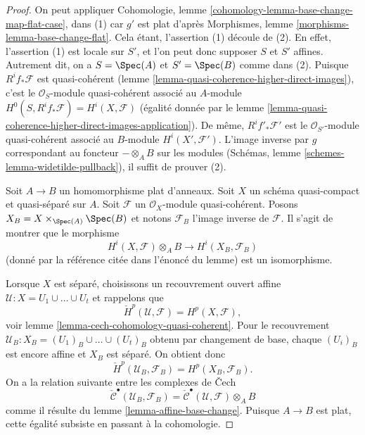 \begin{proof}
On peut appliquer Cohomologie, lemme \ref{cohomology-lemma-base-change-map-flat-case}, dans
(1) car $g'$ est plat d'après
Morphismes, lemme \ref{morphisms-lemma-base-change-flat}.
Cela étant, l'assertion (1) découle de (2). En effet,
l'assertion (1) est locale sur $S'$, et l'on peut donc supposer $S$
et $S'$ affines. Autrement dit, on a $S = \Spec(A)$
et $S' = \Spec(B)$ comme dans
(2). Puisque $R^if_*\mathcal{F}$ est quasi-cohérent
(lemme \ref{lemma-quasi-coherence-higher-direct-images}),
c'est le $\mathcal{O}_S$-module quasi-cohérent associé au
$A$-module $H^0(S, R^if_*\mathcal{F}) = H^i(X, \mathcal{F})$
(égalité donnée par
le lemme \ref{lemma-quasi-coherence-higher-direct-images-application}). De
même, $R^if'_*\mathcal{F}'$ est le
$\mathcal{O}_{S'}$-module quasi-cohérent associé au $B$-module
$H^i(X', \mathcal{F}')$. L'image inverse par $g$ correspondant au
foncteur $- \otimes_A B$ sur les
modules (Schémas, lemme \ref{schemes-lemma-widetilde-pullback}),
il suffit de prouver (2).

\medskip\noindent
Soit $A \to B$ un homomorphisme plat d'anneaux.
Soit $X$ un schéma quasi-compact et quasi-séparé sur $A$.
Soit $\mathcal{F}$ un $\mathcal{O}_X$-module quasi-cohérent.
Posons $X_B = X \times_{\Spec(A)} \Spec(B)$ et notons
$\mathcal{F}_B$ l'image inverse de $\mathcal{F}$.
Il s'agit de montrer que le morphisme
$$
H^i(X, \mathcal{F}) \otimes_A B \longrightarrow H^i(X_B, \mathcal{F}_B)
$$
(donné par la référence citée dans l'énoncé du lemme)
est un isomorphisme.

\medskip\noindent
Lorsque $X$ est séparé, choisissons un recouvrement ouvert affine
$\mathcal{U} : X = U_1 \cup \ldots \cup U_t$ et rappelons que
$$
\check{H}^p(\mathcal{U}, \mathcal{F}) = H^p(X, \mathcal{F}),
$$
voir
lemme \ref{lemma-cech-cohomology-quasi-coherent}. Pour
le recouvrement $\mathcal{U}_B : X_B = (U_1)_B \cup \ldots \cup (U_t)_B$ obtenu
par changement de base, chaque $(U_i)_B$ est encore
affine et $X_B$ est séparé. On obtient donc
$$
\check{H}^p(\mathcal{U}_B, \mathcal{F}_B) = H^p(X_B, \mathcal{F}_B).
$$
On a la relation suivante entre les complexes de {\v C}ech
$$
\check{\mathcal{C}}^\bullet(\mathcal{U}_B, \mathcal{F}_B) =
\check{\mathcal{C}}^\bullet(\mathcal{U}, \mathcal{F}) \otimes_A B
$$
comme il résulte du
lemme \ref{lemma-affine-base-change}.
Puisque $A \to B$ est plat, cette égalité subsiste en passant à la cohomologie.


\end{proof}
